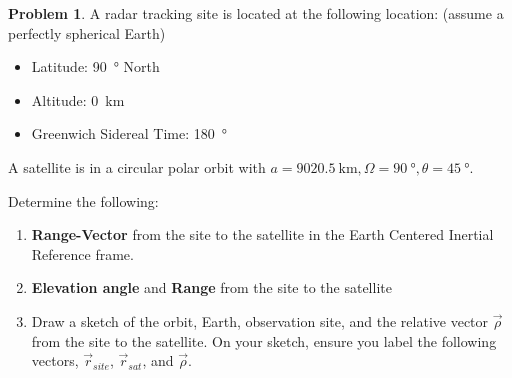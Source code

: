 \documentclass[10pt]{article}
\theoremstyle{definition}
\newtheorem{prob}{Problem}[section]
\newenvironment{subprob}%
{\renewcommand{\theenumi}{\alph{enumi}}\renewcommand{\labelenumi}{(\theenumi)}\begin{enumerate}}%
{\end{enumerate}}%
\newcommand{\extrapage}{\clearpage\newpage\null\newpage}
\begin{document}
\begin{prob}
    A radar tracking site is located at the following location: (assume a perfectly spherical Earth)
    \begin{itemize}
        \item Latitude: \SI{90}{\degree} North
        \item Altitude: \SI{0}{\kilo\meter}
        \item Greenwich Sidereal Time: \SI{180}{\degree}
    \end{itemize}

    A satellite is in a circular polar orbit with \( a = \SI{9020.5}{\kilo\meter}, \Omega = \SI{90}{\degree}, \theta = \SI{45}{\degree}\).

    Determine the following:
    \begin{subprob}
    \item \textbf{Range-Vector} from the site to the satellite in the Earth Centered Inertial Reference frame.
    \item \textbf{Elevation angle} and \textbf{Range} from the site to the satellite
    \item Draw a sketch of the orbit, Earth, observation site, and the relative vector \( \vec \rho \) from the site to the satellite.
        On your sketch, ensure you label the following vectors, \( \vec r_{site} \), \( \vec r_{sat} \), and \( \vec \rho \).
    \end{subprob}
\end{prob}

\extrapage
\extrapage
\end{document}
